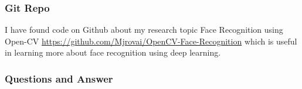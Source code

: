  \subsubsection{Git Repo}
I have found code on Github about my research topic Face Recognition using Open-CV \url{https://github.com/Mjrovai/OpenCV-Face-Recognition} which is useful in learning more about face recognition using deep learning.


\subsubsection{Questions and Answer} 
